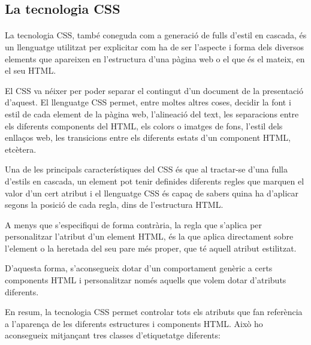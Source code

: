 \subsection{La tecnologia CSS}

    \paragraph{}
    La tecnologia CSS, també coneguda com a generació de fulls d'estil en cascada, és un llenguatge utilitzat per explicitar com ha de ser l'aspecte i forma dels diversos elements que apareixen en l’estructura d’una pàgina web o el que és el mateix, en el seu HTML.

    El CSS va néixer per poder separar el contingut d'un document de la presentació d'aquest. El llenguatge CSS permet, entre moltes altres coses, decidir la font i estil de cada element de la pàgina web, l'alineació del text, les separacions entre els diferents components del HTML, els colors o imatges de fons, l'estil dels enllaços web, les transicions entre els diferents estats d’un component HTML, etcètera.

    Una de les principals característiques del CSS és que al tractar-se d'una fulla d'estils en cascada, un element pot tenir definides diferents regles que marquen el valor d’un cert atribut i el llenguatge CSS és capaç de sabers quina ha d’aplicar segons la posició de cada regla, dins de l'estructura HTML.

    A menys que s’especifiqui de forma contrària, la regla que s’aplica per per\-so\-na\-lit\-zar l'atribut d'un element HTML, és la que aplica directament sobre l’element o la heretada del seu pare més proper, que té aquell atribut estilitzat.

    D'aquesta forma, s'aconsegueix dotar d'un comportament genèric a certs components HTML i personalitzar només aquells que volem dotar d'atributs diferents.

    En resum, la tecnologia CSS permet controlar tots els atributs que fan referència a l'aparença de les diferents estructures i components HTML. Això ho aconsegueix mitjançant tres classes d'etiquetatge diferents:

